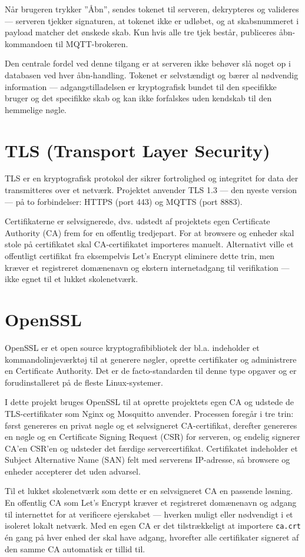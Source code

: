 \documentclass[a4paper,12pt]{article}
\begin{document}
Når brugeren trykker ''Åbn'', sendes tokenet til serveren, dekrypteres og valideres — serveren tjekker signaturen, at tokenet ikke er udløbet, og at skabsnummeret i payload matcher det ønskede skab. Kun hvis alle tre tjek består, publiceres åbn-kommandoen til MQTT-brokeren.

Den centrale fordel ved denne tilgang er at serveren ikke behøver slå noget op i databasen ved hver åbn-handling. Tokenet er selvstændigt og bærer al nødvendig information — adgangstilladelsen er kryptografisk bundet til den specifikke bruger og det specifikke skab og kan ikke forfalskes uden kendskab til den hemmelige nøgle.

\section{TLS (Transport Layer Security)}

TLS er en kryptografisk protokol der sikrer fortrolighed og integritet for data der transmitteres over et netværk. Projektet anvender TLS 1.3 — den nyeste version — på to forbindelser: HTTPS (port 443) og MQTTS (port 8883).

Certifikaterne er selvsignerede, dvs. udstedt af projektets egen Certificate Authority (CA) frem for en offentlig tredjepart. For at browsere og enheder skal stole på certifikatet skal CA-certifikatet importeres manuelt. Alternativt ville et offentligt certifikat fra eksempelvis Let's Encrypt eliminere dette trin, men kræver et registreret domænenavn og ekstern internetadgang til verifikation — ikke egnet til et lukket skolenetværk.

\section{OpenSSL}

OpenSSL er et open source kryptografibibliotek der bl.a. indeholder et kommandolinjeværktøj til at generere nøgler, oprette certifikater og administrere en Certificate Authority. Det er de facto-standarden til denne type opgaver og er forudinstalleret på de fleste Linux-systemer.

I dette projekt bruges OpenSSL til at oprette projektets egen CA og udstede de TLS-certifikater som Nginx og Mosquitto anvender. Processen foregår i tre trin: først genereres en privat nøgle og et selvsigneret CA-certifikat, derefter genereres en nøgle og en Certificate Signing Request (CSR) for serveren, og endelig signerer CA'en CSR'en og udsteder det færdige servercertifikat. Certifikatet indeholder et Subject Alternative Name (SAN) felt med serverens IP-adresse, så browsere og enheder accepterer det uden advarsel.

Til et lukket skolenetværk som dette er en selvsigneret CA en passende løsning. En offentlig CA som Let's Encrypt kræver et registreret domænenavn og adgang til internettet for at verificere ejerskabet — hverken muligt eller nødvendigt i et isoleret lokalt netværk. Med en egen CA er det tilstrækkeligt at importere \texttt{ca.crt} én gang på hver enhed der skal have adgang, hvorefter alle certifikater signeret af den samme CA automatisk er tillid til.
\end{document}
